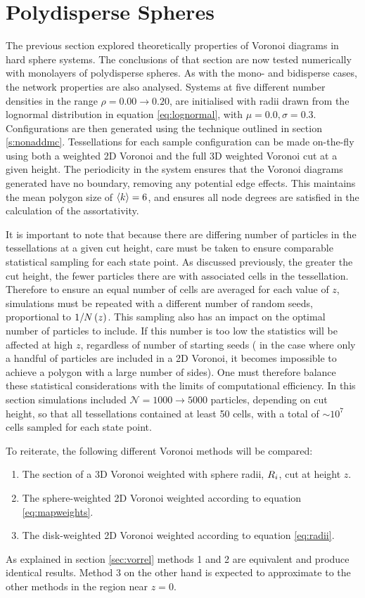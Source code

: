 \section{Polydisperse Spheres}

The previous section explored theoretically properties of Voronoi diagrams in \qtd{} hard sphere systems.
The conclusions of that section are now tested numerically with monolayers of polydisperse spheres.
As with the mono\-- and bidisperse cases, the network properties are also analysed.
Systems at five different number densities in the range $\rho=0.00\rightarrow0.20$, are initialised with radii drawn from the lognormal distribution in equation \eqref{eq:lognormal}, with $\mu=0.0,\sigma=0.3$.
Configurations are then generated using the \mc{} technique outlined in section \ref{s:nonaddmc}.
Tessellations for each sample configuration can be made on-the-fly using both a weighted 2D Voronoi and the full 3D weighted Voronoi cut at a given height.
The periodicity in the system ensures that the Voronoi diagrams generated have no boundary, removing any potential edge effects. 
This maintains the mean polygon size of $\langle k \rangle=6$, and ensures all node degrees are satisfied in the calculation of the assortativity.

It is important to note that because there are differing number of particles in the tessellations at a given cut height, care must be taken to ensure comparable statistical sampling for each state point. 
As discussed previously, the greater the cut height, the fewer particles there are with associated cells in the tessellation.
Therefore to ensure an equal number of cells are averaged for each value of $z$, simulations must be repeated with a different number of random seeds, proportional to  $1/N\left(z\right)$.
This sampling also has an impact on the optimal number of particles to include.
If this number is too low the statistics will be affected at high $z$, regardless of number of starting seeds (\eg{} in the case where only a handful of particles are included in a 2D Voronoi, it becomes impossible to achieve a polygon with a large number of sides).
One must therefore balance these statistical considerations with the limits of computational efficiency.
In this section simulations included $\mathcal{N}=1000\rightarrow 5000$ particles, depending on cut height, so that all tessellations contained at least 50 cells, with a total of $\sim 10^7$ cells sampled for each state point.

To reiterate, the following different Voronoi methods will be compared:
\begin{enumerate}
	\item The section of a 3D Voronoi weighted with sphere radii, $R_i$, cut at height $z$.
	\item The sphere\--weighted 2D Voronoi weighted according to equation \eqref{eq:mapweights}.
	\item The disk\--weighted 2D Voronoi weighted according to equation \eqref{eq:radii}.
\end{enumerate}
As explained in section \ref{sec:vorrel} methods 1 and 2 are equivalent and produce identical results.
Method 3 on the other hand is expected to approximate to the other methods in the region near $z=0$.

